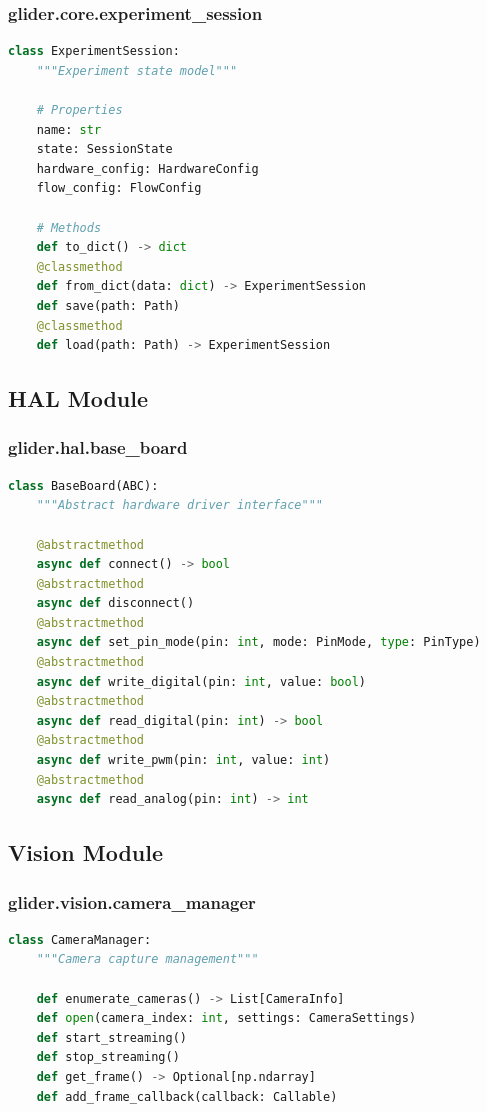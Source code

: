 \documentclass[11pt,a4paper]{article}
\begin{document}
\subsubsection{glider.core.experiment\_session}

\begin{lstlisting}[language=Python]
class ExperimentSession:
    """Experiment state model"""

    # Properties
    name: str
    state: SessionState
    hardware_config: HardwareConfig
    flow_config: FlowConfig

    # Methods
    def to_dict() -> dict
    @classmethod
    def from_dict(data: dict) -> ExperimentSession
    def save(path: Path)
    @classmethod
    def load(path: Path) -> ExperimentSession
\end{lstlisting}

\subsection{HAL Module}

\subsubsection{glider.hal.base\_board}

\begin{lstlisting}[language=Python]
class BaseBoard(ABC):
    """Abstract hardware driver interface"""

    @abstractmethod
    async def connect() -> bool
    @abstractmethod
    async def disconnect()
    @abstractmethod
    async def set_pin_mode(pin: int, mode: PinMode, type: PinType)
    @abstractmethod
    async def write_digital(pin: int, value: bool)
    @abstractmethod
    async def read_digital(pin: int) -> bool
    @abstractmethod
    async def write_pwm(pin: int, value: int)
    @abstractmethod
    async def read_analog(pin: int) -> int
\end{lstlisting}

\subsection{Vision Module}

\subsubsection{glider.vision.camera\_manager}

\begin{lstlisting}[language=Python]
class CameraManager:
    """Camera capture management"""

    def enumerate_cameras() -> List[CameraInfo]
    def open(camera_index: int, settings: CameraSettings)
    def start_streaming()
    def stop_streaming()
    def get_frame() -> Optional[np.ndarray]
    def add_frame_callback(callback: Callable)
\end{lstlisting}
\end{document}
